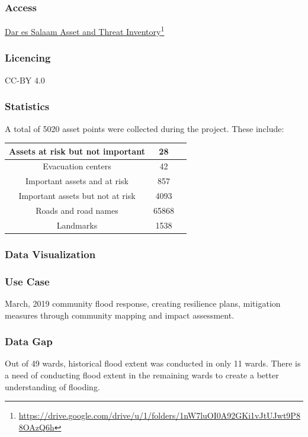 \documentclass[a4paper,12pt,twoside]{article}
\begin{document}
\subsubsection{Access}
\href{https://drive.google.com/drive/u/1/folders/1nW7luOI0A92GKi1vJtUJwt9P88OAzQ6h}{Dar es Salaam Asset and Threat Inventory}\footnote{\url{https://drive.google.com/drive/u/1/folders/1nW7luOI0A92GKi1vJtUJwt9P88OAzQ6h}}

\subsubsection{Licencing}
CC-BY 4.0

\subsubsection{Statistics}
A total of 5020 asset points were collected during the project. These include:
\begin{center}
\begin{tabular}{ |c|c|c| }
 \hline
 Assets at risk but not important & 28 \\ 
 \hline
 Evacuation centers & 42 \\ 
 \hline
 Important assets and at risk & 857 \\
 \hline
 Important assets but not at risk & 4093 \\
 \hline
 Roads and road names & 65868 \\
 \hline
 Landmarks & 1538 \\
 \hline
\end{tabular}
\end{center}

\subsubsection{Data Visualization}

\subsubsection{Use Case}
March, 2019 community flood response, creating resilience plans, mitigation measures through community mapping and impact assessment.

\subsubsection{Data Gap}
Out of 49 wards, historical flood extent was conducted in only 11 wards. There is a need of conducting flood extent in the remaining wards to create a better understanding of flooding.
\end{document}
